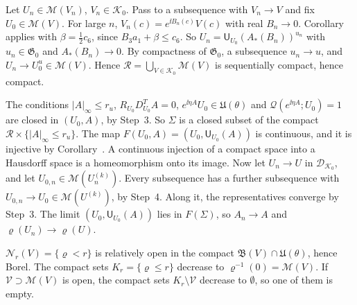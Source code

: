 \begin{detail}
\begin{step}
Let $U_n\in\mathscr M(V_n)$, $V_n\in\mathcal K_0$. Pass to a subsequence with $V_n\to V$ and fix $U_0\in\mathscr M(V)$. For large $n$, $V_n(c)=e^{\ii B_n(c)}V(c)$ with real $B_n\to0$. Corollary~ applies with $\beta=\frac12c_6$, since $B_3a_1+\beta\le c_6$. So $U_n=\mathsf U_{U_0}(A_*(B_n))^{u_n}$ with $u_n\in\mathfrak G_0$ and $A_*(B_n)\to0$. By compactness of $\mathfrak G_0$, a subsequence $u_n\to u$, and $U_n\to U_0^u\in\mathscr M(V)$. Hence $\mathcal R=\bigcup_{V\in\mathcal K_0}\mathscr M(V)$ is sequentially compact, hence compact.
\end{step}
\begin{step}
The conditions $|A|_\infty\le r_u$, $R_{U_0}D_{U_0}^TA=0$, $e^{\ii\eta A}U_0\in\mathfrak U(\theta)$ and $\mathcal Q(e^{\ii\eta A};U_0)=1$ are closed in $(U_0,A)$, by Step~3. So $\Sigma$ is a closed subset of the compact $\mathcal R\times\{|A|_\infty\le r_u\}$. The map $F(U_0,A)=(U_0,\mathsf U_{U_0}(A))$ is continuous, and it is injective by Corollary~. A continuous injection of a compact space into a Hausdorff space is a homeomorphism onto its image. Now let $U_n\to U$ in $\mathcal D_{\mathcal K_0}$, and let $U_{0,n}\in\mathscr M(U_n^{(k)})$. Every subsequence has a further subsequence with $U_{0,n}\to U_0\in\mathscr M(U^{(k)})$, by Step~4. Along it, the representatives converge by Step~3. The limit $(U_0,\mathsf U_{U_0}(A))$ lies in $F(\Sigma)$, so $A_n\to A$ and $\varrho(U_n)\to\varrho(U)$.
\end{step}
\begin{step}[(c), neighbourhoods]
$\mathscr N_r(V)=\{\varrho<r\}$ is relatively open in the compact $\mathfrak B(V)\cap\mathfrak U(\theta)$, hence Borel. The compact sets $K_r=\{\varrho\le r\}$ decrease to $\varrho^{-1}(0)=\mathscr M(V)$. If $\mathcal V\supset\mathscr M(V)$ is open, the compact sets $K_r\setminus\mathcal V$ decrease to $\emptyset$, so one of them is empty.
\end{step}
\end{detail}

